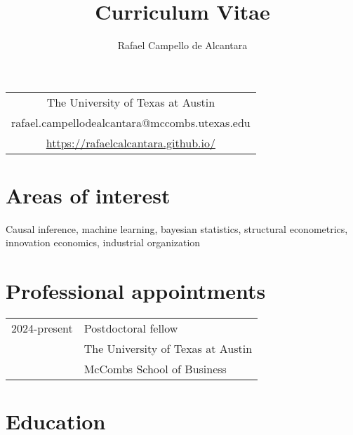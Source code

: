 \documentclass[10pt]{article}
\author{Rafael Campello de Alcantara}
\date{}
\title{Curriculum Vitae}
\begin{document}
\maketitle
\begin{center}
\begin{tabular}{c}
The University of Texas at Austin\\
rafael.campellodealcantara@mccombs.utexas.edu\\
\url{https://rafaelcalcantara.github.io/}
\end{tabular}
\end{center}

\section*{Areas of interest}
\label{sec:org948a080}
Causal inference, machine learning, bayesian statistics,
structural econometrics, innovation economics, industrial
organization

\section*{Professional appointments}
\label{sec:org13d5684}
\begin{footnotesize}
  \begin{tabular}{ll}
    2024-present & Postdoctoral fellow\\
    & The University of Texas at Austin\\
    & McCombs School of Business
    \end{tabular}
\end{footnotesize}

\section*{Education}
\label{sec:org7da8f15}
\end{document}
